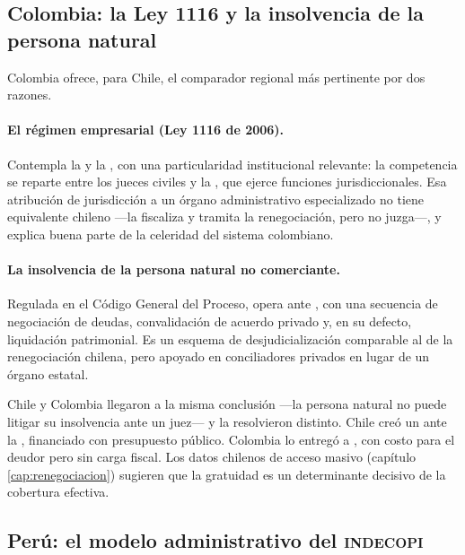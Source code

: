 \subsection{Colombia: la Ley 1116 y la insolvencia de la persona natural}

Colombia ofrece, para Chile, el comparador regional más pertinente por dos razones.

\paragraph{El régimen empresarial (Ley 1116 de 2006).} Contempla la
 y la , con una particularidad
institucional relevante: la competencia se reparte entre los jueces civiles y la
, que ejerce funciones jurisdiccionales. Esa atribución de
jurisdicción a un órgano administrativo especializado no tiene equivalente chileno ---la \superir{}
fiscaliza y tramita la renegociación, pero no juzga---, y explica buena parte de la celeridad del
sistema colombiano.

\paragraph{La insolvencia de la persona natural no comerciante.} Regulada en el Código General del
Proceso, opera ante , con una secuencia de negociación
de deudas, convalidación de acuerdo privado y, en su defecto, liquidación patrimonial. Es un
esquema de desjudicialización comparable al de la renegociación chilena, pero apoyado en
conciliadores privados en lugar de un órgano estatal.

\begin{foco}
Chile y Colombia llegaron a la misma conclusión ---la persona natural no puede litigar su
insolvencia ante un juez--- y la resolvieron distinto. Chile creó un  ante la \superir{}, financiado con presupuesto público. Colombia lo
entregó a , con costo para el deudor pero sin carga fiscal. Los
datos chilenos de acceso masivo (capítulo \ref{cap:renegociacion}) sugieren que la gratuidad es un
determinante decisivo de la cobertura efectiva.
\end{foco}

\subsection{Perú: el modelo administrativo del \textsc{indecopi}}

